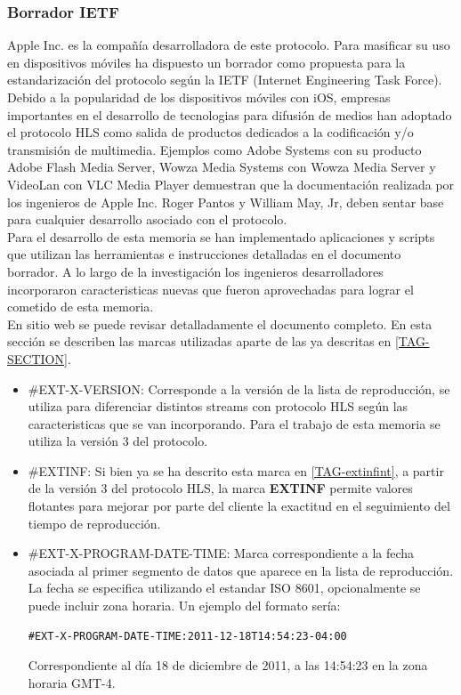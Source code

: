 \subsubsection{Borrador IETF}
Apple Inc. es la compañía desarrolladora de este protocolo. Para masificar su uso en dispositivos móviles ha dispuesto un borrador como propuesta para la estandarización del protocolo según la IETF (Internet Engineering Task Force).
Debido a la popularidad de los dispositivos móviles con iOS, empresas importantes en el desarrollo de tecnologias para difusión de medios han adoptado el protocolo HLS como salida de productos dedicados a la codificación y/o transmisión de multimedia. Ejemplos como Adobe Systems con su producto Adobe Flash Media Server, Wowza Media Systems con Wowza Media Server y VideoLan con VLC Media Player demuestran que la documentación realizada por los ingenieros de Apple Inc. Roger Pantos y William May, Jr, deben sentar base para cualquier desarrollo asociado con el protocolo.\\

Para el desarrollo de esta memoria se han implementado aplicaciones y scripts que utilizan las herramientas e instrucciones detalladas en el documento borrador. A lo largo de la investigación los ingenieros desarrolladores incorporaron caracteristicas nuevas que fueron aprovechadas para lograr el cometido de esta memoria.\\

En sitio web \cite{apple-draftpantos} se puede revisar detalladamente el documento completo. En esta sección se describen las marcas utilizadas aparte de las ya descritas en \ref{TAG-SECTION}.

\begin{itemize}
\item \#EXT-X-VERSION: Corresponde a la versión de la lista de reproducción, se utiliza para diferenciar distintos streams con protocolo HLS según las caracteristicas que se van incorporando. Para el trabajo de esta memoria se utiliza la versión 3 del protocolo.

\item \#EXTINF: Si bien ya se ha descrito esta marca en \ref{TAG-extinfint}, a partir de la versión 3 del protocolo HLS, la marca \textbf{EXTINF} permite valores flotantes para mejorar por parte del cliente la exactitud en el seguimiento del tiempo de reproducción. 

\item \#EXT-X-PROGRAM-DATE-TIME: Marca correspondiente a la fecha asociada al primer segmento de datos que aparece en la lista de reproducción. La fecha se especifica utilizando el estandar ISO 8601, opcionalmente se puede incluir zona horaria. Un ejemplo del formato sería:

\begin{lstlisting}
#EXT-X-PROGRAM-DATE-TIME:2011-12-18T14:54:23-04:00
\end{lstlisting}

Correspondiente al día 18 de diciembre de 2011, a las 14:54:23 en la zona horaria GMT-4.

\end{itemize}
